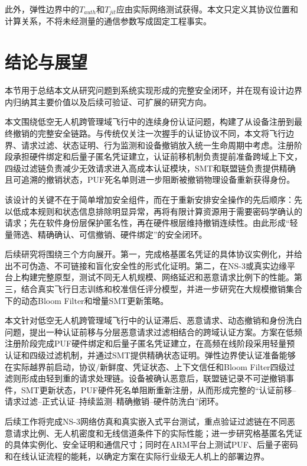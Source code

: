 \documentclass[conference]{IEEEtran}
\begin{document}
	此外，弹性边界中的$T_{auth}$和$T_{jit}$应由实际网络测试获得。本文只定义其协议位置和计算关系，不将未经测量的通信参数写成固定工程事实。
	
	\section{结论与展望}
	
	本节用于总结本文从研究问题到系统实现形成的完整安全闭环，并在现有设计边界内归纳其主要价值以及后续可验证、可扩展的研究方向。
	
	本文围绕低空无人机跨管理域飞行中的连续身份认证问题，构建了从设备注册到最终撤销的完整安全链路。与传统仅关注一次握手的认证协议不同，本文将飞行边界、请求过滤、状态证明、行为监测和设备撤销放入统一生命周期中考虑。注册阶段承担硬件绑定和后量子匿名凭证建立，认证前移机制负责提前准备跨域上下文，四级过滤链负责减少无效请求进入高成本认证模块，SMT和联盟链负责提供精确且可追溯的撤销状态，PUF死名单则进一步阻断被撤销物理设备重新获得身份。
	
	该设计的关键不在于简单增加安全组件，而在于重新安排安全操作的先后顺序：先以低成本规则和状态信息排除明显异常，再将有限计算资源用于需要密码学确认的请求；先在软件身份层保护匿名性，再在硬件根层维持撤销连续性。由此形成“轻量筛选、精确确认、可信撤销、硬件绑定”的安全闭环。
	
	后续研究将围绕三个方向展开。第一，完成格基匿名凭证的具体协议实例化，并给出不可伪造、不可链接和盲化安全性的形式化证明。第二，在NS-3或真实边缘平台上构建完整原型，测试不同无人机规模、网络延迟和恶意请求比例下的性能。第三，结合真实飞行日志训练和校准信任评分模型，并进一步研究在大规模撤销集合下的动态Bloom Filter和增量SMT更新策略。
	
	本文针对低空无人机跨管理域飞行中的认证滞后、恶意请求、动态撤销和身份洗白问题，提出一种认证前移与分层恶意请求过滤相结合的跨域认证方案。方案在低频注册阶段完成PUF硬件绑定和后量子匿名凭证建立，在高频在线阶段采用轻量预认证和四级过滤机制，并通过SMT提供精确状态证明。弹性边界使认证准备能够在实际越界前启动，协议/新鲜度、凭证状态、上下文信任和Bloom Filter四级过滤则形成由轻到重的请求处理链。设备被确认恶意后，联盟链记录不可逆撤销事件，SMT更新状态，PUF硬件死名单阻断重新注册，从而形成完整的“认证前移--请求过滤--正式认证--持续监测--精确撤销--硬件防洗白”闭环。
	
	后续工作将完成NS-3网络仿真和真实嵌入式平台测试，重点验证过滤链在不同恶意请求比例、无人机密度和无线信道条件下的实际性能；进一步研究格基匿名凭证的具体实例化、安全证明和通信尺寸；同时在ARM平台上测试PUF、后量子密码和在线认证流程的能耗，以确定方案在实际行业级无人机上的部署边界。
	
\end{document}
